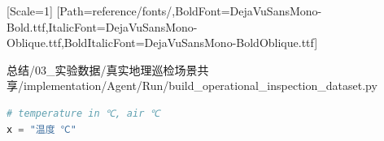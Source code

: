 
\usepackage{needspace}
\setmonofont{NSimSun}[Scale=1]
\newfontfamily{}[Path=reference/fonts/,BoldFont=DejaVuSansMono-Bold.ttf,ItalicFont=DejaVuSansMono-Oblique.ttf,BoldItalicFont=DejaVuSansMono-BoldOblique.ttf]

{\small\ttfamily 总结/\allowbreak{}03\_\allowbreak{}实验数据/\allowbreak{}真实地理巡检场景共享/\allowbreak{}implementation/\allowbreak{}Agent/\allowbreak{}Run/\allowbreak{}build\_\allowbreak{}operational\_\allowbreak{}inspection\_\allowbreak{}dataset.py}\par
\begin{lstlisting}[language=Python]
# temperature in ℃, air ℃
x = "温度 ℃"
\end{lstlisting}